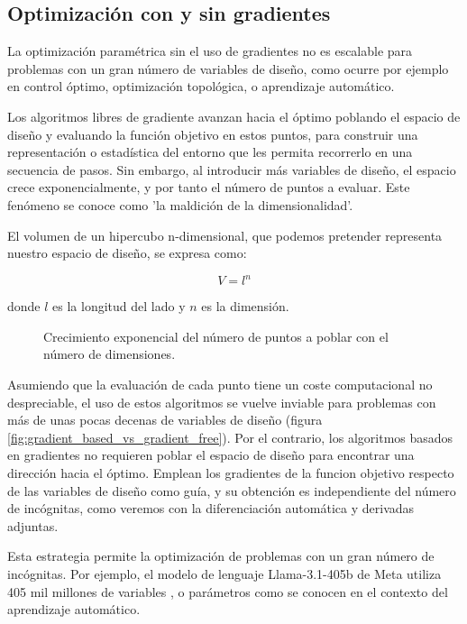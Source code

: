\subsection{Optimización con y sin gradientes}

La optimización paramétrica sin el uso de gradientes no es escalable para
problemas con un gran número de variables de diseño, como ocurre por ejemplo en
control óptimo, optimización topológica, o aprendizaje automático.

Los algoritmos libres de gradiente avanzan hacia el óptimo poblando el espacio
de diseño y evaluando la función objetivo en estos puntos, para construir una
representación o estadística del entorno que les permita recorrerlo en una
secuencia de pasos. Sin embargo, al introducir más variables de diseño, el
espacio crece exponencialmente, y por tanto el número de puntos a evaluar. Este
fenómeno se conoce como 'la maldición de la dimensionalidad'.

El volumen de un hipercubo n-dimensional, que podemos pretender representa
nuestro espacio de diseño, se expresa como:

\begin{equation}
	V = l^n
\end{equation}

donde $l$ es la longitud del lado y $n$ es la dimensión.


\begin{figure}[h] \centering
	\centering
	
	\caption{Crecimiento exponencial del número de puntos a poblar con el número de dimensiones.}
	\label{fig:hypercube}
\end{figure}

Asumiendo que la evaluación de cada punto tiene un coste computacional no
despreciable, el uso de estos algoritmos se vuelve inviable para problemas con
más de unas pocas decenas de variables de diseño (figura
\ref{fig:gradient_based_vs_gradient_free}). Por el contrario, los algoritmos
basados en gradientes no requieren poblar el espacio de diseño para encontrar
una dirección hacia el óptimo. Emplean los gradientes de la funcion objetivo
respecto de las variables de diseño como guía, y su obtención es independiente
del número de incógnitas, como veremos con la diferenciación automática y
derivadas adjuntas.

Esta estrategia permite la optimización de problemas con un gran número de
incógnitas. Por ejemplo, el modelo de lenguaje Llama-3.1-405b de Meta utiliza
405 mil millones de variables \cite{dubey2024llama}, o parámetros como se
conocen en el contexto del aprendizaje automático.

